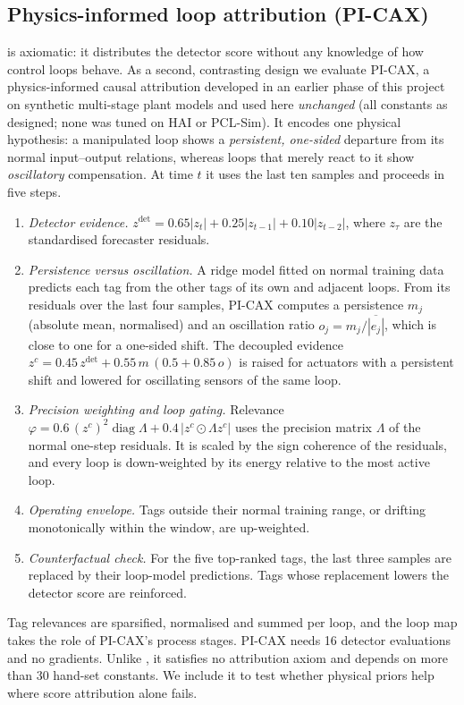 \subsection{Physics-informed loop attribution (PI-CAX)}\label{sec:picax}
\LX{} is axiomatic: it distributes the detector score without any knowledge of how control loops behave. As a second, contrasting design we evaluate PI-CAX, a physics-informed causal attribution developed in an earlier phase of this project on synthetic multi-stage plant models and used here \emph{unchanged} (all constants as designed; none was tuned on HAI or PCL-Sim). It encodes one physical hypothesis: a manipulated loop shows a \emph{persistent, one-sided} departure from its normal input--output relations, whereas loops that merely react to it show \emph{oscillatory} compensation. At time $t$ it uses the last ten samples and proceeds in five steps.
\begin{enumerate}
\item \emph{Detector evidence.} $z^{\mathrm{det}}=0.65|z_t|+0.25|z_{t-1}|+0.10|z_{t-2}|$, where $z_\tau$ are the standardised forecaster residuals.
\item \emph{Persistence versus oscillation.} A ridge model fitted on normal training data predicts each tag from the other tags of its own and adjacent loops. From its residuals over the last four samples, PI-CAX computes a persistence $m_j$ (absolute mean, normalised) and an oscillation ratio $o_j=m_j/\overline{|e_j|}$, which is close to one for a one-sided shift. The decoupled evidence $z^{c}=0.45\,z^{\mathrm{det}}+0.55\,m\,(0.5+0.85\,o)$ is raised for actuators with a persistent shift and lowered for oscillating sensors of the same loop.
\item \emph{Precision weighting and loop gating.} Relevance $\varphi=0.6\,(z^c)^2\operatorname{diag}\Lambda+0.4\,|z^c\odot\Lambda z^c|$ uses the precision matrix $\Lambda$ of the normal one-step residuals. It is scaled by the sign coherence of the residuals, and every loop is down-weighted by its energy relative to the most active loop.
\item \emph{Operating envelope.} Tags outside their normal training range, or drifting monotonically within the window, are up-weighted.
\item \emph{Counterfactual check.} For the five top-ranked tags, the last three samples are replaced by their loop-model predictions. Tags whose replacement lowers the detector score are reinforced.
\end{enumerate}
Tag relevances are sparsified, normalised and summed per loop, and the loop map takes the role of PI-CAX's process stages. PI-CAX needs 16 detector evaluations and no gradients. Unlike \LX, it satisfies no attribution axiom and depends on more than 30 hand-set constants. We include it to test whether physical priors help where score attribution alone fails.

